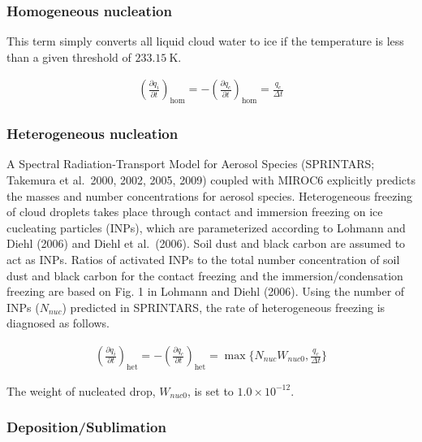 \hypertarget{homogeneous-nucleation}{%
\subsubsection{Homogeneous nucleation}\label{homogeneous-nucleation}}

This term simply converts all liquid cloud water to ice if the
temperature is less than a given threshold of \(233.15 \mathrm{~K}\).

\begin{eqnarray}
\left(\frac{\partial q_i}{\partial t}\right)_{\text {hom}}
=-\left(\frac{\partial q_c}{\partial t}\right)_{\text {hom}}
=  \frac{q_c}{\Delta t}
\end{eqnarray}

\hypertarget{heterogeneous-nucleation}{%
\subsubsection{Heterogeneous
nucleation}\label{heterogeneous-nucleation}}

A Spectral Radiation-Transport Model for Aerosol Species (SPRINTARS;
Takemura et al.~2000, 2002, 2005, 2009) coupled with MIROC6 explicitly
predicts the masses and number concentrations for aerosol species.
Heterogeneous freezing of cloud droplets takes place through contact and
immersion freezing on ice cucleating particles (INPs), which are
parameterized according to Lohmann and Diehl (2006) and Diehl et
al.~(2006). Soil dust and black carbon are assumed to act as INPs.
Ratios of activated INPs to the total number concentration of soil dust
and black carbon for the contact freezing and the immersion/condensation
freezing are based on Fig. 1 in Lohmann and Diehl (2006). Using the
number of INPs (\(N_{nuc}\)) predicted in SPRINTARS, the rate of
heterogeneous freezing is diagnosed as follows.

\begin{eqnarray}
\left(\frac{\partial q_i}{\partial t}\right)_{\text {het}}
=-\left(\frac{\partial q_c}{\partial t}\right)_{\text {het}}
=  \max \{N_{nuc} W_{nuc0}, \frac{q_c}{\Delta t}\}
\end{eqnarray}

The weight of nucleated drop, \(W_{nuc0}\), is set to
\(1.0\times10^{-12}\).

\hypertarget{depositionsublimation}{%
\subsubsection{Deposition/Sublimation}\label{depositionsublimation}}


